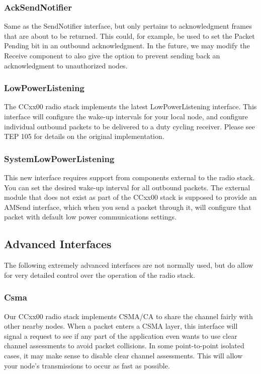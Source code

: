 \documentclass{article}
\begin{document}
\subsubsection{AckSendNotifier}
Same as the SendNotifier interface, but only pertains to acknowledgment frames that are 
about to be returned. This could, for example, be used to set the Packet Pending bit
in an outbound acknowledgment. In the future, we may modify the Receive component to
also give the option to prevent sending back an acknowledgment to unauthorized nodes.

\subsubsection{LowPowerListening}
The CCxx00 radio stack implements the latest LowPowerListening interface. This interface
will configure the wake-up intervals for your local node, and configure individual outbound packets
to be delivered to a duty cycling receiver. Please see TEP 105 \cite{tep105} for details on the original implementation. 

\subsubsection{SystemLowPowerListening}
This new interface requires support from components external to the radio stack. You can 
set the desired wake-up interval for all outbound packets. The external module that does
not exist as part of the CCxx00 stack is supposed to provide an AMSend interface, which
when you send a packet through it, will configure that packet with default low power 
communications settings. 

\subsection{Advanced Interfaces}
\label{sec:advancedinterfaces}

The following extremely advanced interfaces are not normally used, but do allow for 
very detailed control over the operation of the radio stack.

\subsubsection{Csma}
Our CCxx00 radio stack implements CSMA/CA to share the channel fairly with other nearby
nodes. When a packet enters a CSMA layer, this interface will signal a request to see
if any part of the application even wants to use clear channel assessments to avoid packet collisions.
In some point-to-point isolated cases, it may make sense to disable clear channel assessments.
This will allow your node's transmissions to occur as fast as possible.
\end{document}
